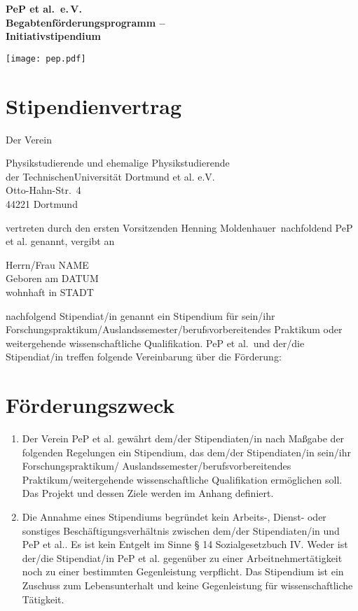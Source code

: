 \documentclass[
  paper=a4,
  fontsize=12pt,
  DIV=16,
  parskip=full,
  headinclude=true,
]{scrartcl}
\date{02. Februar 2015}
\newcommand\vorsitzender{Henning Moldenhauer}
\newcommand\stipendiat{NAME}		%
\newcommand\stipgeburt{DATUM}		%
\newcommand\stipanschrift{STADT}	%
\begin{document}
  \begin{minipage}{0.45\textwidth}%
	  \large\bfseries PeP et al.\ e.\,V.\\%
	  Begabtenförderungsprogramm –\\%
	  Initiativstipendium%
  \end{minipage}%
  \hfill%
  \begin{minipage}{0.45\textwidth}%
	\hfill\texttt{[image: pep.pdf]}
  \end{minipage}%
\section*{Stipendienvertrag}

Der Verein

Physikstudierende und ehemalige Physikstudierende\\
der TechnischenUniversität Dortmund et al. e.V.\\
Otto-Hahn-Str.~4\\
44221 Dortmund

vertreten durch den ersten Vorsitzenden \vorsitzender\ nachfoldend
PeP et al. genannt, vergibt an

Herrn/Frau \stipendiat\\
Geboren am \stipgeburt\\
wohnhaft in \stipanschrift

nachfolgend Stipendiat/in genannt ein Stipendium für sein/ihr
Forschungspraktikum/Auslandssemester/berufsvorbereitendes Praktikum oder
weitergehende wissenschaftliche Qualifikation.
PeP et al.\ und der/die Stipendiat/in treffen folgende Vereinbarung über die
Förderung:

\section{Förderungszweck}

\begin{enumerate}[\qquad(1)]
	\item Der Verein PeP et al. gewährt dem/der Stipendiaten/in nach
		Maßgabe der folgenden Regelungen ein Stipendium, das
		dem/der Stipendiaten/in sein/ihr Forschungspraktikum/
		Auslandssemester/berufsvorbereitendes Praktikum/weitergehende
		wissenschaftliche Qualifikation ermöglichen soll.
		Das Projekt und dessen Ziele werden im Anhang definiert.
	\item Die Annahme eines Stipendiums begründet kein Arbeits-, Dienst-
		oder sonstiges Beschäftigungsverhältnis zwischen dem/der
		Stipendiaten/in und PeP et al.. Es ist kein Entgelt im Sinne
		§ 14 Sozialgesetzbuch IV. Weder ist der/die Stipendiat/in
		PeP et al. gegenüber zu einer Arbeitnehmertätigkeit
		noch zu einer bestimmten Gegenleistung verpflicht.
		Das Stipendium ist ein Zuschuss zum Lebensunterhalt und
		keine Gegenleistung für wissenschaftliche Tätigkeit.
\end{enumerate}
\end{document}
